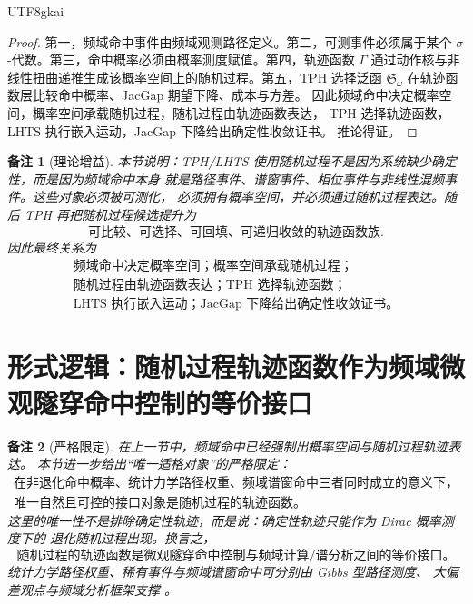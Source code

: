 \documentclass[12pt]{article}
\newtheorem{remark}{备注}[section]
\begin{document}
\begin{CJK*}{UTF8}{gkai}
\begin{proof}
第一，频域命中事件由频域观测路径定义。第二，可测事件必须属于某个
\(\sigma\)-代数。第三，命中概率必须由概率测度赋值。第四，轨迹函数 \(\Gamma\)
通过动作核与非线性扭曲递推生成该概率空间上的随机过程。第五，TPH 选择泛函
\(\mathfrak S_\omega\) 在轨迹函数层比较命中概率、JacGap 期望下降、成本与方差。
因此频域命中决定概率空间，概率空间承载随机过程，随机过程由轨迹函数表达，
TPH 选择轨迹函数，LHTS 执行嵌入运动，JacGap 下降给出确定性收敛证书。
推论得证。
\end{proof}

\begin{remark}[理论增益]
本节说明：TPH/LHTS 使用随机过程不是因为系统缺少确定性，而是因为频域命中本身
就是路径事件、谱窗事件、相位事件与非线性混频事件。这些对象必须被可测化，
必须拥有概率空间，并必须通过随机过程表达。随后 TPH 再把随机过程候选提升为
\[
\boxed{
\text{可比较、可选择、可回填、可递归收敛的轨迹函数族}.
}
\]
因此最终关系为
\[
\boxed{
\begin{gathered}
\text{频域命中决定概率空间；概率空间承载随机过程；}
\\
\text{随机过程由轨迹函数表达；TPH 选择轨迹函数；}
\\
\text{LHTS 执行嵌入运动；JacGap 下降给出确定性收敛证书。}
\end{gathered}
}
\]
\end{remark}

\section{形式逻辑：随机过程轨迹函数作为频域微观隧穿命中控制的等价接口}
\label{sec:trajectory-function-equivalent-interface}

\begin{remark}[严格限定]
在上一节中，频域命中已经强制出概率空间与随机过程轨迹表达。
本节进一步给出“唯一适格对象”的严格限定：
\[
\boxed{
\begin{gathered}
\text{在非退化命中概率、统计力学路径权重、频域谱窗命中三者同时成立的意义下，}
\\
\text{唯一自然且可控的接口对象是随机过程的轨迹函数。}
\end{gathered}
}
\]
这里的唯一性不是排除确定性轨迹，而是说：确定性轨迹只能作为 Dirac 概率测度下的
退化随机过程出现。换言之，
\[
\boxed{
\text{随机过程的轨迹函数是微观隧穿命中控制与频域计算/谱分析之间的等价接口。}
}
\]
统计力学路径权重、稀有事件与频域谱窗命中可分别由 Gibbs 型路径测度、
大偏差观点与频域分析框架支撑
\cite{Touchette2009LargeDeviations,FreidlinWentzell2012RandomPerturbations,OppenheimSchafer2010DSP,Mallat2009Wavelet}。
\end{remark}


\end{CJK*}
\end{document}
